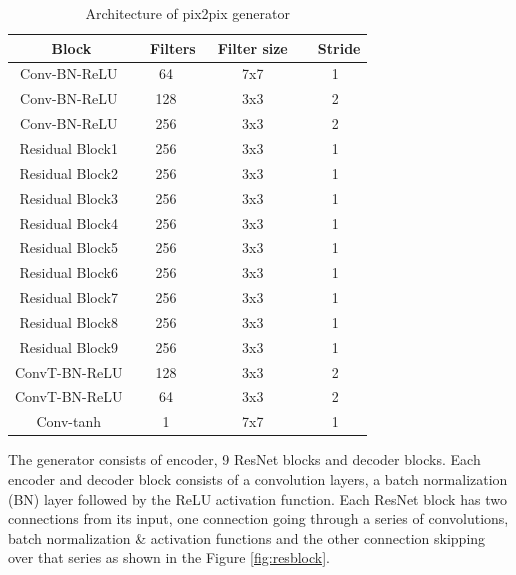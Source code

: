 \begin{table}[h]
\centering
\begin{tabular}{|c|c|c|c|} 
\hline
\textbf{~ Block~} & \textbf{~ Filters} & \textbf{~Filter size~} & \textbf{~Stride}  \\ 
\hline
Conv-BN-ReLU      & 64                 & 7x7                    & 1                 \\ 
\hline
Conv-BN-ReLU      & 128                & 3x3                    & 2                 \\ 
\hline
Conv-BN-ReLU      & 256                & 3x3                    & 2                 \\ 
\hline
Residual Block1   & 256                & 3x3                    & 1                 \\ 
\hline
Residual Block2   & 256                & 3x3                    & 1                 \\ 
\hline
Residual Block3   & 256                & 3x3                    & 1                 \\ 
\hline
Residual Block4   & 256                & 3x3                    & 1                 \\ 
\hline
Residual Block5   & 256                & 3x3                    & 1                 \\ 
\hline
Residual Block6   & 256                & 3x3                    & 1                 \\ 
\hline
Residual Block7   & 256                & 3x3                    & 1                 \\ 
\hline
Residual Block8   & 256                & 3x3                    & 1                 \\ 
\hline
Residual Block9   & 256                & 3x3                    & 1                 \\ 
\hline
ConvT-BN-ReLU     & 128                & 3x3                    & 2                 \\ 
\hline
ConvT-BN-ReLU     & 64                 & 3x3                    & 2                 \\ 
\hline
Conv-tanh         & 1                  & 7x7                    & 1                 \\
\hline
\end{tabular}
\caption{Architecture of pix2pix generator}
\label{tab:tab1}
\end{table}
The generator consists of encoder, 9 ResNet blocks and decoder blocks. Each encoder and decoder block consists of a convolution layers, a batch normalization (BN) layer followed by the ReLU activation function. Each ResNet block has two connections from its input, one connection going through a series of convolutions, batch normalization \& activation functions and the other connection skipping over that series as shown in the Figure \ref{fig:resblock}.

